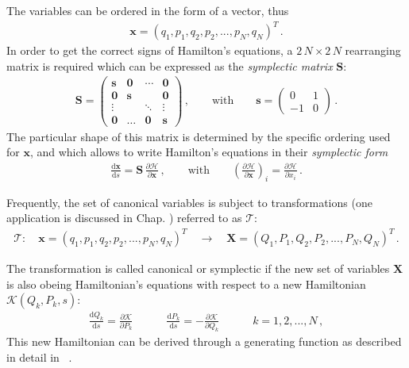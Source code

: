 The variables can be ordered in the form of a vector, thus 
\begin{align}
\mathbf{x} = (q_1,p_1,q_2,p_2,...,p_N,q_N)^T \, .
\end{align}
In order to get the correct signs of Hamilton's equations, a $2\,N \times 2\,N$ rearranging matrix is required which can be expressed as the \emph{symplectic matrix} $\mathbf{S}$:
\begin{align}
\mathbf{S}
=
\begin{pmatrix}
\mathbf{s} & \mathbf{0}  & \cdots  & \mathbf{0} \\ 
\mathbf{0} & \mathbf{s} &  & \mathbf{0} \\ 
\vdots &  & \ddots  & \vdots \\ 
\mathbf{0} & \hdots & \mathbf{0} & \mathbf{s}
\end{pmatrix} \, ,
 \quad \quad \text{with} \quad \quad \mathbf{s} = 
 \begin{pmatrix}
0 & 1\\ 
-1 &  0
\end{pmatrix} \, .
\end{align}
The particular shape of this matrix is determined by the specific ordering used for $\mathbf{x}$, and which allows to write Hamilton's equations in their \emph{symplectic form}
\begin{align}
\frac{\mathrm{d} \mathbf{x}}{\mathrm{d}s} = \mathbf{S} \, \frac{\partial \mathcal{H}}{\partial \mathbf{x}} \, , \quad \quad \text{with} \quad \quad \left( \frac{\partial \mathcal{H}}{\partial \mathbf{x}} \right)_i = \frac{\partial \mathcal{H}}{\partial x_i} \, .
\end{align}

Frequently, the set of canonical variables is subject to transformations (one application is discussed in Chap. ) referred to as $\mathcal{T}$:
\begin{align}
\mathcal{T}:  \quad \mathbf{x} = (q_1,p_1,q_2,p_2,...,p_N,q_N)^T \quad \rightarrow \quad \mathbf{X} = (Q_1,P_1,Q_2,P_2,...,P_N,Q_N)^T \, .
\end{align}

The transformation is called canonical or symplectic if the new set of variables $\mathbf{X}$ is also obeing Hamiltonian's equations with respect to a new Hamiltonian $\mathcal{K}(Q_k,P_k,s)$:
\begin{align}
\frac{\mathrm{d} Q_k}{\mathrm{d}s} = \frac{\partial \mathcal{K}}{\partial P_k} \quad \quad \quad \frac{\mathrm{d} P_k}{\mathrm{d}s} = -\frac{\partial \mathcal{K}}{\partial Q_k} \quad \quad \quad k=1,2,...,N\, ,
\end{align}
This new Hamiltonian can be derived through a generating function as described in detail in ~\cite{}. 

